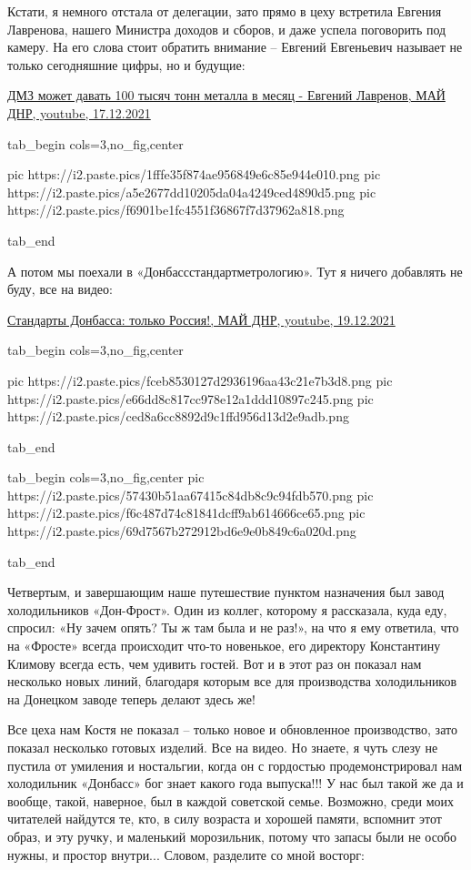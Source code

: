 Кстати, я немного отстала от делегации, зато прямо в цеху встретила Евгения
Лавренова, нашего Министра доходов и сборов, и даже успела поговорить под
камеру. На его слова стоит обратить внимание – Евгений Евгеньевич называет не
только сегодняшние цифры, но и будущие:

\href{https://www.youtube.com/watch?v=dkEUYGFAyNo}{%
ДМЗ может давать 100 тысяч тонн металла в месяц - Евгений Лавренов, МАЙ ДНР, youtube, %
17.12.2021%
}

\ifcmt
  tab_begin cols=3,no_fig,center

     pic https://i2.paste.pics/1fffe35f874ae956849e6c85e944e010.png
		 pic https://i2.paste.pics/a5e2677dd10205da04a4249ced4890d5.png
		 pic https://i2.paste.pics/f6901be1fc4551f36867f7d37962a818.png

  tab_end
\fi

А потом мы поехали в «Донбассстандартметрологию». Тут я ничего добавлять не
буду, все на видео:

\href{https://www.youtube.com/watch?v=_BN6UZckBjk}{%
Стандарты Донбасса: только Россия!, МАЙ ДНР, youtube, 19.12.2021%
}


\ifcmt
  tab_begin cols=3,no_fig,center

     pic https://i2.paste.pics/fceb8530127d2936196aa43c21e7b3d8.png
		 pic https://i2.paste.pics/e66dd8c817cc978e12a1ddd10897c245.png
		 pic https://i2.paste.pics/ced8a6cc8892d9c1ffd956d13d2e9adb.png

  tab_end

  tab_begin cols=3,no_fig,center
		 pic https://i2.paste.pics/57430b51aa67415c84db8c9c94fdb570.png
		 pic https://i2.paste.pics/f6c487d74c81841dcff9ab614666ce65.png
		 pic https://i2.paste.pics/69d7567b272912bd6e9e0b849c6a020d.png

  tab_end
\fi

Четвертым, и завершающим наше путешествие пунктом назначения был завод
холодильников «Дон-Фрост». Один из коллег, которому я рассказала, куда еду,
спросил: «Ну зачем опять? Ты ж там была и не раз!», на что я ему ответила, что
на «Фросте» всегда происходит что-то новенькое, его директору Константину
Климову всегда есть, чем удивить гостей. Вот и в этот раз он показал нам
несколько новых линий, благодаря которым все для производства холодильников на
Донецком заводе теперь делают здесь же!

Все цеха нам Костя не показал – только новое и обновленное производство, зато
показал несколько готовых изделий. Все на видео. Но знаете, я чуть слезу не
пустила от умиления и ностальгии, когда он с гордостью продемонстрировал нам
холодильник «Донбасс» бог знает какого года выпуска!!! У нас был такой же да и
вообще, такой, наверное, был в каждой советской семье. Возможно, среди моих
читателей найдутся те, кто, в силу возраста и хорошей памяти, вспомнит этот
образ, и эту ручку, и маленький морозильник, потому что запасы были не особо
нужны, и простор внутри... Словом, разделите со мной восторг:

